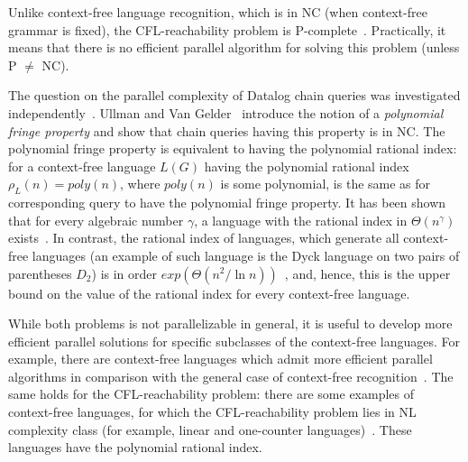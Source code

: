 \documentclass{ws-ijfcs}
\begin{document}
Unlike context-free language recognition, which is in NC (when context-free grammar is fixed), the CFL-reachability problem is P-complete~\cite{ PCompl, RepSeq,  Yannakakis}. Practically, it means that there is no efficient parallel algorithm for solving this problem (unless P $\neq$ NC). 


The question on the parallel complexity of Datalog chain queries was investigated independently~\cite{ChainQ, Vardi, Ullman}. Ullman and Van Gelder~\cite{Ullman} introduce the notion of a \textit{polynomial fringe property} and show that chain queries having this property is in NC. The polynomial fringe property is equivalent to having the polynomial rational index: for a context-free language $L(G)$ having the polynomial rational index $\rho_L(n) = poly(n)$, where $poly(n)$ is some polynomial, is the same as for corresponding query to have the polynomial fringe property. It has been shown that for every algebraic number $\gamma$, a language with the rational index in $\Theta (n^\gamma )$ exists~\cite{GreibRat}.  In contrast, the rational index of languages, which generate all context-free languages (an example of such language is the Dyck language on two pairs of parentheses $D_2$) is in order $exp(\Theta(n^2/\ln n))$~\cite{CFRat}, and, hence, this is the upper bound on the value of the rational index for every context-free language.


While both problems is not parallelizable in general, it is useful to develop more efficient parallel solutions for specific subclasses of the context-free languages. For example, there are context-free languages which admit more efficient parallel algorithms in comparison with the general case of context-free recognition~\cite{IBARRA2, IBARRA, Okhotin2014ComplexityOI}.  The same holds for the CFL-reachability problem: there are some examples of context-free languages, for which the CFL-reachability problem lies in NL complexity class (for example, linear and one-counter languages)~\cite{labelledGraphs, LReach, Regularrealizability, VyalyiRR}. These languages have the polynomial rational index.
\end{document}
